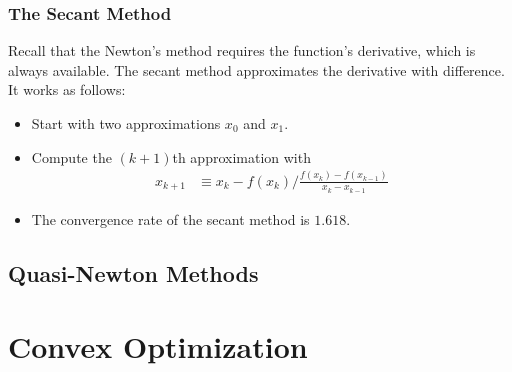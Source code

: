 \subsection{The Secant Method}
Recall that the Newton's method requires the function's derivative, which is always available. The secant method approximates the derivative with difference. It works as follows:
\begin{itemize}
  \item Start with two approximations $x_0$ and $x_1$.
  \item Compute the $(k+1)$th approximation with
  \begin{align}
    x_{k+1} & \equiv x_k - f(x_k)/\frac{f(x_k) - f(x_{k-1})}{x_k - x_{k-1}}
  \end{align}
  \item The convergence rate of the secant method is $1.618$.

\end{itemize}

\section{Quasi-Newton Methods}

\chapter{Convex Optimization}







